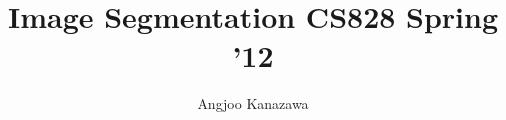 \newcommand{\sig}{\sigma}
\newcommand{\eps}{\epsilon}
\newcommand{\del}{\delta}
\newcommand{\ah}{\alpha}
\newcommand{\lam}{\lambda}
\newcommand{\gam}{\gamma}
\newcommand{\kap}{\kappa}
\newcommand{\rarr}{\rightarrow}
\newcommand{\larr}{\leftarrow}
\newcommand{\ol}{\overline}
\newcommand{\mbb}{\mathbb}
\newcommand{\contra}{\Rightarrow\Leftarrow}
\newcommand{\lc}{\langle} %
\newcommand{\rc}{\rangle} %

\newcommand{\ben}{\begin{enumerate}}
\newcommand{\een}{\end{enumerate}}
\newcommand{\beq}{\begin{quote}}
\newcommand{\enq}{\end{quote}}
\newcommand{\hsone}{\hspace*{1cm}}
\newcommand{\hstwo}{\hspace*{2cm}}

\newcommand{\noi}{\noindent}
\parskip 5pt
\parindent 0pt

\documentclass[a4paper]{article}
\usepackage{amsmath,amssymb,algorithmic}

\title{Image Segmentation CS828 Spring '12}
\author{Angjoo Kanazawa}
\maketitle
\section{January 25th First Lecture}
\textbf{Definition}: Segmentation (for this class):
\begin{itemize}
\item About low level vision in general
\item Requires a lot of knowledge about th eworld, high level understanding,
quite challenging.
\item  So we're going to focus on simpler segmentation
that doesn't require that much knowledge about the world: Uniform
surfaces, smooth shape. Still there will be varietion in intensity.
\item Want to find uniform region in things (texture, color, motion, smoothness), not necessarily world property. Removed from true segmentation of objects but still useful.
\item Image is an 2D geometric structure. Segmentation is clustering
  that takes advantage of this structure. Based on the assumption that
  near-by pixels have the same intensity. 
\item 
\end{itemize}

